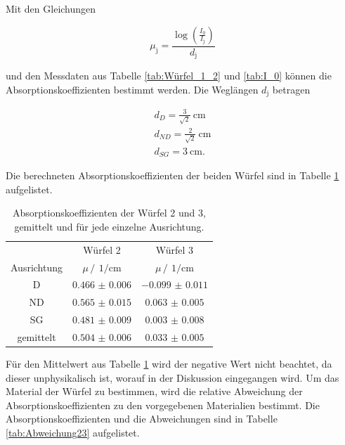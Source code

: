 Mit den Gleichungen

\begin{equation*}
    \mu_{\text{j}}= \frac{\log{\left(\frac{I_0}{I_\text{j}}\right)}}{d_{\text{j}}}
\end{equation*} 

und den Messdaten aus Tabelle \ref{tab:Würfel_1_2} und \ref{tab:I_0} können die Absorptionskoeffizienten bestimmt werden. 
Die Weglängen $d_{\text{j}}$ betragen

\begin{gather*}
    d_{D} =\frac{3}{\sqrt{2}}\SI{}{\centi\meter}\\
    d_{ND}=\frac{2}{\sqrt{2}}\SI{}{\centi\meter}\\
    d_{SG}=\SI{3}{\centi\meter}.
\end{gather*}

Die berechneten Absorptionskoeffizienten der beiden Würfel sind in Tabelle \ref{tab:Absorptionskoeffizienten_1_2} aufgelistet.

\FloatBarrier
\begin{table}
    \centering
    \caption{Absorptionskoeffizienten der Würfel 2 und 3, gemittelt und für jede einzelne Ausrichtung.}
    \label{tab:Absorptionskoeffizienten_1_2}
    \begin{tabular}{c c c}
        \toprule
        &Würfel 2&Würfel 3\\
        \cmidrule(lr){2-2}\cmidrule(lr){3-3}
        Ausrichtung&$\mu \,/\,\SI{}{1\per\centi\meter}$&$\mu \,/\,\SI{}{1\per\centi\meter}$\\
        \midrule
        D &$\num{0.466(6)}$&$\num{-0.099(11)}$\\
        ND&$\num{0.565(15)}$&$\num{0.063(5)}$\\
        SG&$\num{0.481(9)}$&$\num{0.003(8)}$\\
        \midrule
        gemittelt&$\num{0.504(6)}$&$\num{0.033(5)}$\\
        \bottomrule
    \end{tabular}
\end{table}
\FloatBarrier

Für den Mittelwert aus Tabelle \ref{tab:Absorptionskoeffizienten_1_2} wird der negative Wert nicht beachtet, da dieser unphysikalisch ist,
worauf in der Diskussion eingegangen wird. Um das Material der Würfel zu bestimmen, wird die relative Abweichung der Absorptionskoeffizienten zu 
den vorgegebenen Materialien bestimmt. Die Absorptionskoeffizienten und die Abweichungen sind in Tabelle \ref{tab:Abweichung23}
aufgelistet.

